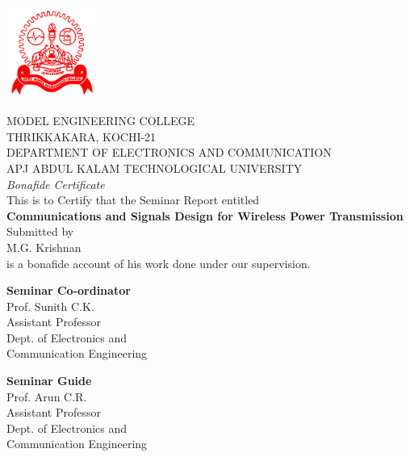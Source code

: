 \documentclass[hidelinks, 12pt]{report}
\begin{document}
\centering
\section*{}
\vspace{1cm}
\includegraphics[height=3cm,width=3cm]{logo}

\begin{center}
MODEL ENGINEERING COLLEGE\\
\vspace{0.5cm}
THRIKKAKARA, KOCHI-21\\
\vspace{0.5cm}
DEPARTMENT OF ELECTRONICS AND COMMUNICATION \\
\vspace{0.5cm}
APJ ABDUL KALAM TECHNOLOGICAL UNIVERSITY \\
\vspace{1cm}
\textit{Bonafide Certificate}
\\This is to Certify that the Seminar Report entitled\\
\vspace{0.5cm}
\textbf{Communications and Signals Design for Wireless Power Transmission} 
\\
\vspace{0.5cm}
Submitted by\\
\vspace{0.2cm}
M.G. Krishnan\\
\vspace{0.2cm}
is a bonafide account of his work done under our supervision. \\
\end{center}

\vspace{2cm}
\begin{minipage}[t]{10cm}
\flushleft \textbf{Seminar Co-ordinator}\\
Prof. Sunith C.K.\\
Assistant Professor\\
Dept. of Electronics and\\
Communication Engineering
\end{minipage}
\vspace{2cm}
\begin{minipage}[t]{5cm}
\flushleft \textbf{Seminar Guide}\\
Prof. Arun C.R.\\
Assistant Professor\\
Dept. of Electronics and\\
Communication Engineering
\end{minipage}
\end{document}
